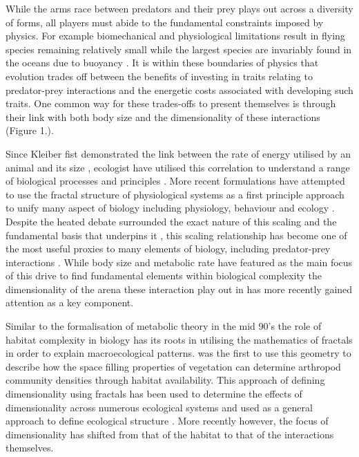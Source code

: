 While the arms race between predators and their prey plays out across a diversity of forms, all players must abide to the fundamental constraints imposed by physics. For example biomechanical and physiological limitations result in flying species remaining relatively small \citep{chatterjee2007aerodynamics,dudley2002mechanisms} while the largest species are invariably found in the oceans due to buoyancy \citep{heim2015cope}. It is within these boundaries of physics that evolution trades off between the benefits of investing in traits relating to predator-prey interactions and the energetic costs associated with developing such traits. One common way for these trades-offs to present themselves is through their link with both body size and the dimensionality of these interactions (Figure 1.).

Since Kleiber fist demonstrated the link between the rate of energy utilised by an animal and its size \citep{kleiber1947body}, ecologist have utilised this correlation to understand a range of biological processes and principles \citep{sibly2012metabolic,west1997general,brown2004}. More recent formulations have attempted to use the fractal structure of physiological systems as a first principle approach to unify many aspect of biology including physiology, behaviour and ecology \citep{west1997general,brown2004}. Despite the heated debate surrounded the exact nature of this scaling and the fundamental basis that underpins it \citep{isaac2010metabolic}, this scaling relationship has become one of the most useful proxies to many elements of biology, including predator-prey interactions \citep{brown2004}. While body size and metabolic rate have featured as the main focus of this drive to find fundamental elements within biological complexity the dimensionality of the arena these interaction play out in has more recently gained attention as a key component.


Similar to the formalisation of metabolic theory in the mid 90's the role of habitat complexity in biology has its roots in utilising the mathematics of fractals in order to explain macroecological patterns. \cite{morse1985fractal} was the first to use this geometry to describe how the space filling properties of vegetation can determine arthropod community densities through habitat availability. This approach of defining dimensionality using fractals has been used to determine the effects of dimensionality across numerous ecological systems \citep{kenkel1996fractals,shorrocks1991fractal,gunnarsson1992fractal,gee1994body,jeffries1993invertebrate} and used as a general approach to define ecological structure \citep{cohen1995marine,henderson2010linking}. More recently however, the focus of dimensionality has shifted from that of the habitat to that of the interactions themselves.



